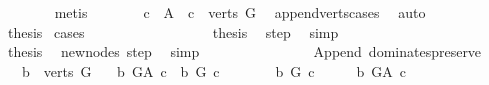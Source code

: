 \begin{isabellebody}
\ \ \ \ \ \ \isamarkupfalse%
\ metis\isanewline
\ \ \ \ \isamarkupfalse%
\ \isamarkupfalse%
\ {\isachardoublequoteopen}c\ {\isasymin}\ A{\isachardoublequoteclose}\ {\isacharbar}{\kern0pt}\ {\isachardoublequoteopen}c\ {\isasymin}\ verts\ G{\isachardoublequoteclose}\ \isamarkupfalse%
\ append{\isacharunderscore}{\kern0pt}verts{\isacharunderscore}{\kern0pt}cases\ \isamarkupfalse%
\ auto\isanewline
\ \ \ \ \isamarkupfalse%
\ \isamarkupfalse%
\ {\isacharquery}{\kern0pt}thesis\ \isamarkupfalse%
{\isacharparenleft}{\kern0pt}cases{\isacharparenright}{\kern0pt}\isanewline
\ \ \ \ \ \ \isamarkupfalse%
\ {}\isanewline
\ \ \ \ \ \ \isamarkupfalse%
\ \isamarkupfalse%
\ {\isacharquery}{\kern0pt}thesis\ \isamarkupfalse%
\ step\ \isamarkupfalse%
\ simp\isanewline
\ \ \ \ \isamarkupfalse%
\isanewline
\ \ \ \ \ \ \isamarkupfalse%
\ {}\isanewline
\ \ \ \ \ \ \isamarkupfalse%
\ \isamarkupfalse%
\ {\isacharquery}{\kern0pt}thesis\ \isamarkupfalse%
\ new{\isacharunderscore}{\kern0pt}nodes\ step\ \isamarkupfalse%
\ simp\isanewline
\ \ \ \ \isamarkupfalse%
\isanewline
\ \ \isamarkupfalse%
\ \isanewline
{}\isamarkupfalse%
%
\endisatagproof
{\isafoldproof}%
%
\isadelimproof
\ \ \ \ \isanewline
%
\endisadelimproof
\isanewline
{}\isamarkupfalse%
\ {\isacharparenleft}{\kern0pt}\ Append{\isacharparenright}{\kern0pt}\ dominates{\isacharunderscore}{\kern0pt}preserve{\isacharcolon}{\kern0pt}\isanewline
\ \ \ {\isachardoublequoteopen}b\ {\isasymin}\ verts\ G{\isachardoublequoteclose}\isanewline
\ \ \ {\isachardoublequoteopen}b\ {\isasymrightarrow}\isactrlbsub G{\isacharunderscore}{\kern0pt}A\isactrlesub \ c\ {\isasymlongleftrightarrow}\ b\ {\isasymrightarrow}\isactrlbsub G\isactrlesub \ c{\isachardoublequoteclose}\isanewline
%
\isadelimproof
%
\endisadelimproof
%
\isatagproof
{}\isamarkupfalse%
\ \ \isanewline
\ \ \isamarkupfalse%
\ {\isachardoublequoteopen}\ b\ {\isasymrightarrow}\isactrlbsub G\isactrlesub \ c{\isachardoublequoteclose}\isanewline
\ \ \isamarkupfalse%
\ \isamarkupfalse%
\ {\isachardoublequoteopen}b\ {\isasymrightarrow}\isactrlbsub G{\isacharunderscore}{\kern0pt}A\isactrlesub \ c{\isachardoublequoteclose}\isanewline

\end{isabellebody}
